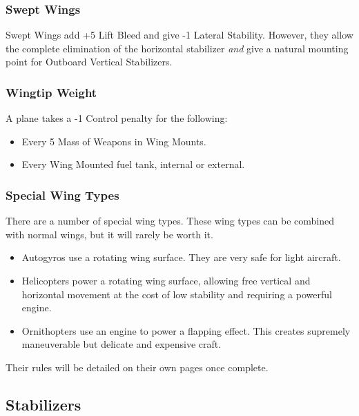 \documentclass{article}
\begin{document}
\subsubsection{Swept Wings}
\label{_Swept Wings}

Swept Wings add +5 Lift Bleed and give -1 Lateral Stability. However,
they allow the complete elimination of the horizontal stabilizer
\emph{and} give a natural mounting point for Outboard Vertical
Stabilizers.

\subsubsection{Wingtip Weight}
\label{_Wingtip Weight}

A plane takes a -1 Control penalty for the following:

\begin{itemize}
    \item          Every 5 Mass of Weapons in Wing Mounts.
    \item          Every Wing Mounted fuel tank, internal or external.
\end{itemize}

\subsubsection{Special Wing Types}
\label{_Special Wing Types}

There are a number of special wing types. These wing types can be
combined with normal wings, but it will rarely be worth it.

\begin{itemize}
    \item          Autogyros use a rotating wing surface. They are very safe for
          light aircraft.
    \item          Helicopters power a rotating wing surface, allowing free
          vertical and horizontal movement at the cost of low stability and
          requiring a powerful engine.
    \item          Ornithopters use an engine to power a flapping effect. This
          creates supremely maneuverable but delicate and expensive craft.
\end{itemize}

Their rules will be detailed on their own pages once complete.

\subsection{Stabilizers}
\label{_Stabilizers}
\end{document}
